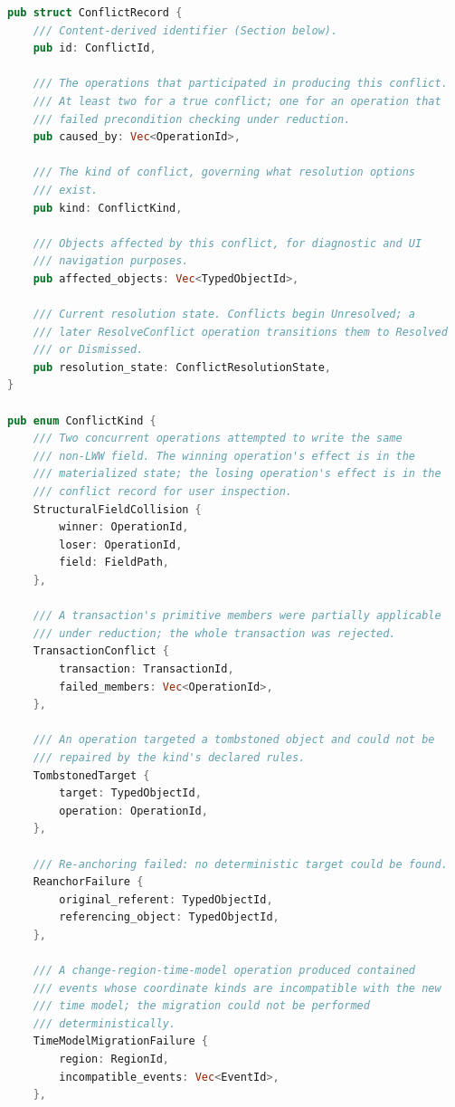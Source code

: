 \documentclass[11pt,letterpaper]{report}
\begin{document}
\begin{lstlisting}[language=Rust]
pub struct ConflictRecord {
    /// Content-derived identifier (Section below).
    pub id: ConflictId,

    /// The operations that participated in producing this conflict.
    /// At least two for a true conflict; one for an operation that
    /// failed precondition checking under reduction.
    pub caused_by: Vec<OperationId>,

    /// The kind of conflict, governing what resolution options
    /// exist.
    pub kind: ConflictKind,

    /// Objects affected by this conflict, for diagnostic and UI
    /// navigation purposes.
    pub affected_objects: Vec<TypedObjectId>,

    /// Current resolution state. Conflicts begin Unresolved; a
    /// later ResolveConflict operation transitions them to Resolved
    /// or Dismissed.
    pub resolution_state: ConflictResolutionState,
}

pub enum ConflictKind {
    /// Two concurrent operations attempted to write the same
    /// non-LWW field. The winning operation's effect is in the
    /// materialized state; the losing operation's effect is in the
    /// conflict record for user inspection.
    StructuralFieldCollision {
        winner: OperationId,
        loser: OperationId,
        field: FieldPath,
    },

    /// A transaction's primitive members were partially applicable
    /// under reduction; the whole transaction was rejected.
    TransactionConflict {
        transaction: TransactionId,
        failed_members: Vec<OperationId>,
    },

    /// An operation targeted a tombstoned object and could not be
    /// repaired by the kind's declared rules.
    TombstonedTarget {
        target: TypedObjectId,
        operation: OperationId,
    },

    /// Re-anchoring failed: no deterministic target could be found.
    ReanchorFailure {
        original_referent: TypedObjectId,
        referencing_object: TypedObjectId,
    },

    /// A change-region-time-model operation produced contained
    /// events whose coordinate kinds are incompatible with the new
    /// time model; the migration could not be performed
    /// deterministically.
    TimeModelMigrationFailure {
        region: RegionId,
        incompatible_events: Vec<EventId>,
    },


\end{lstlisting}
\end{document}
